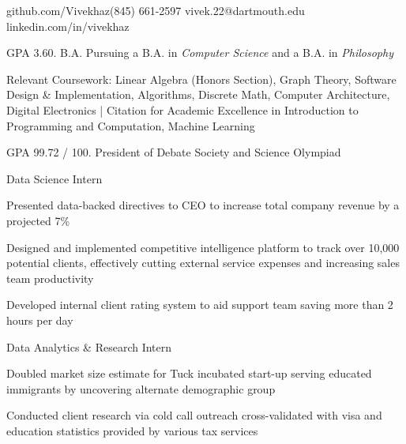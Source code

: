 \documentclass{practical-type-resume}
\begin{document}
\namehead

\address{ vivek.fm}{github.com/Vivekhaz}{(845) 661-2597}{ vivek.22@dartmouth.edu }{linkedin.com/in/vivekhaz}{}


	\begin{position}{}{}
		\item GPA 3.60. B.A. Pursuing a B.A. in \textit{Computer Science} and a B.A. in \textit{Philosophy}
		\item Relevant Coursework: Linear Algebra (Honors Section), Graph Theory, Software Design \& Implementation, Algorithms, Discrete Math, Computer Architecture, Digital Electronics | Citation for Academic Excellence in Introduction to Programming and Computation, Machine Learning
	\end{position}

	\begin{position}{}{}
	\item GPA 99.72 / 100. President of Debate Society and Science Olympiad
	\end{position}


	\begin{position}{Data Science Intern}{}
		\item Presented data-backed directives to CEO to increase total company revenue by a projected 7\%
		\item Designed and implemented competitive intelligence platform to track over 10,000 potential clients, effectively cutting external service expenses and increasing sales team productivity
		\item Developed internal client rating system to aid support team saving more than 2 hours per day
		
	\end{position}
	
	\begin{position}{Data Analytics \& Research Intern}{}
		\item Doubled market size estimate for Tuck incubated start-up serving educated immigrants by uncovering alternate demographic group 
		\item Conducted client research via cold call outreach cross-validated with visa and education statistics provided by various tax services
	\end{position}
	
\end{document}
